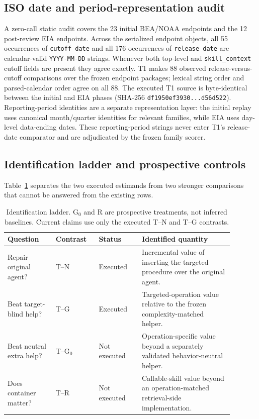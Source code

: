 \subsection{ISO date and period-representation audit}
A zero-call static audit covers the 23 initial BEA/NOAA endpoints and the 12 post-review EIA endpoints. Across the serialized endpoint objects, all 55 occurrences of \texttt{cutoff\_date} and all 176 occurrences of \texttt{release\_date} are calendar-valid \texttt{YYYY-MM-DD} strings. Whenever both top-level and \texttt{skill\_context} cutoff fields are present they agree exactly. T1 makes 88 observed release-versus-cutoff comparisons over the frozen endpoint packages; lexical string order and parsed-calendar order agree on all 88. The executed T1 source is byte-identical between the initial and EIA phases (SHA-256 \texttt{df1950ef3930...d56d522}). Reporting-period identities are a separate representation layer: the initial replay uses canonical month/quarter identities for relevant families, while EIA uses day-level data-ending dates. These reporting-period strings never enter T1's release-date comparator and are adjudicated by the frozen family scorer.

\subsection{Identification ladder and prospective controls}
Table~\ref{tab:identification} separates the two executed estimands from two stronger comparisons that cannot be answered from the existing rows.

\begin{table}[ht]
\centering
\scriptsize
\setlength{\tabcolsep}{3.0pt}
\begin{tabular}{p{0.19\linewidth}p{0.17\linewidth}p{0.17\linewidth}p{0.36\linewidth}}
\toprule
Question & Contrast & Status & Identified quantity \\
\midrule
Repair original agent? & T--N & Executed & Incremental value of inserting the targeted procedure over the original agent. \\
Beat target-blind help? & T--G & Executed & Targeted-operation value relative to the frozen complexity-matched helper. \\
Beat neutral extra help? & T--G$_0$ & Not executed & Operation-specific value beyond a separately validated behavior-neutral helper. \\
Does container matter? & T--R & Not executed & Callable-skill value beyond an operation-matched retrieval-side implementation. \\
\bottomrule
\end{tabular}
\caption{Identification ladder. G$_0$ and R are prospective treatments, not inferred baselines. Current claims use only the executed T--N and T--G contrasts.}
\label{tab:identification}
\end{table}

